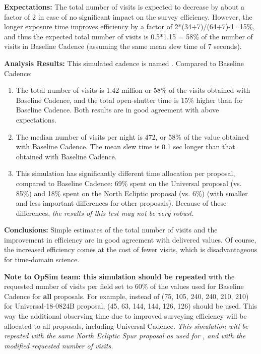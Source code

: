 {\bf Expectations:} The total number of visits is expected to decrease
by about a factor of 2 in case of no significant impact on the survey
efficiency. However, the longer exposure time improves efficiency by a
factor of 2*(34+7)/(64+7)-1=15\%, and thus the expected total number
of visits is 0.5*1.15 = 58\% of the number of visits in Baseline
Cadence (assuming the same mean slew time of 7 seconds).

{\bf Analysis Results:} This simulated cadence is named .
Compared to Baseline Cadence:
\begin{enumerate}
\item The total number of visits is 1.42 million or 58\% of the visits
obtained with Baseline Cadence, and the total open-shutter time is
15\% higher than for Baseline Cadence. Both results are in good
agreement with above expectations.
\item The median number of visits per night is 472, or 58\% of the
value obtained with Baseline Cadence. The mean slew time is 0.1 sec
longer than that obtained with Baseline Cadence.
\item This simulation has significantly different time allocation per
proposal, compared to Baseline Cadence: 69\% spent on the Universal
proposal (vs. 85\%) and 18\%  spent on the North Ecliptic proposal
(vs. 6\%)  (with smaller and less important differences for other
proposals). Because of these differences, {\it the results of this
test may not be very robust.}
\end{enumerate}

{\bf Conclusions:}
Simple estimates of the total number of visits and the improvement in
efficiency are in good agreement with delivered values. Of course, the
increased efficiency comes at the cost of fewer visits, which is
disadvantageous for time-domain science.

{\bf Note to OpSim team: this simulation should be repeated} with the
requested number of visits per field set to 60\% of the values used
for Baseline Cadence for {\bf all} proposals. For example, instead of
(75, 105, 240, 240, 210, 210) for Universal-18-0824B proposal, (45,
63, 144, 144, 126, 126) should be used.  This way the additional
observing time due to improved surveying efficiency will be allocated
to all proposals, including Universal Cadence. {\it This simulation
will be repeated with the same North Ecliptic Spur proposal as used
for , and with the modified requested number of
visits.}


